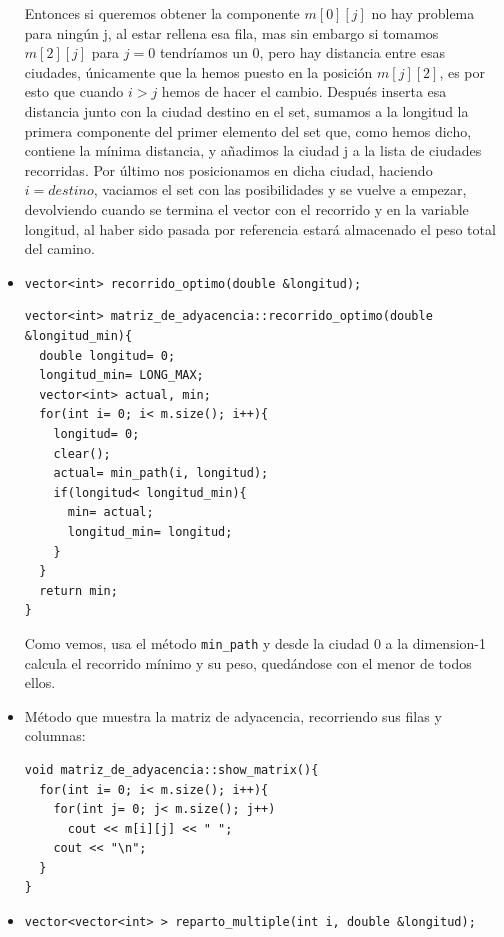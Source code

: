 \documentclass[12pt]{article}
\begin{document}
\begin{itemize}[wide, nosep, labelindent = 0pt, topsep = 1ex]
Entonces si queremos obtener la componente $m[0][j]$ no hay problema para ningún j, al estar rellena esa fila, mas sin embargo si tomamos $m[2][j]$ para $j= 0$ tendríamos un 0, pero hay distancia entre esas ciudades, únicamente que la hemos puesto en la posición $m[j][2]$, es por esto que cuando $i>j$ hemos de hacer el cambio. Después inserta esa distancia junto con la ciudad destino en el set, sumamos a la longitud la primera componente del primer elemento del set que, como hemos dicho, contiene la mínima distancia, y añadimos la ciudad j a la lista de ciudades recorridas. Por último nos posicionamos en dicha ciudad, haciendo $i= destino$, vaciamos el set con las posibilidades y se vuelve a empezar, devolviendo cuando se termina el vector con el recorrido y en la variable longitud, al haber sido pasada por referencia estará almacenado el peso total del camino.  

\item \verb|vector<int> recorrido_optimo(double &longitud);|
\begin{lstlisting}
vector<int> matriz_de_adyacencia::recorrido_optimo(double &longitud_min){
  double longitud= 0;
  longitud_min= LONG_MAX;
  vector<int> actual, min;
  for(int i= 0; i< m.size(); i++){
    longitud= 0;
    clear();
    actual= min_path(i, longitud);
    if(longitud< longitud_min){
      min= actual;
      longitud_min= longitud;
    }
  }
  return min;
}
\end{lstlisting}

Como vemos, usa el método \verb|min_path| y desde la ciudad 0 a la dimension-1 calcula el recorrido mínimo y su peso, quedándose con el menor de todos ellos.
 
\item Método que muestra la matriz de adyacencia, recorriendo sus filas y columnas: 
\begin{lstlisting}
void matriz_de_adyacencia::show_matrix(){
  for(int i= 0; i< m.size(); i++){
    for(int j= 0; j< m.size(); j++)
      cout << m[i][j] << " ";
    cout << "\n";
  }
}
\end{lstlisting}

\item \verb|vector<vector<int> > reparto_multiple(int i, double &longitud);|

\end{itemize}
\end{document}
